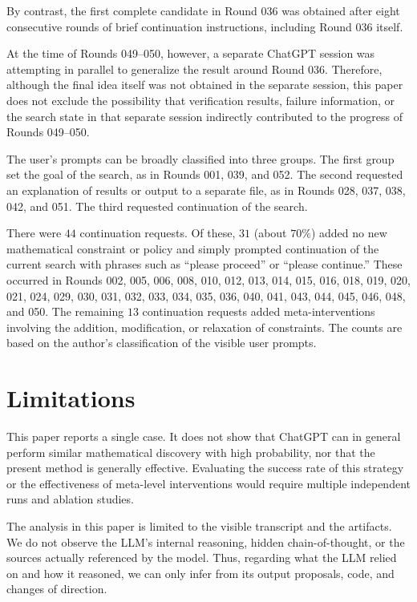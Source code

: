 \documentclass[11pt]{article}
\theoremstyle{definition}
\theoremstyle{remark}
\renewcommand{\_}{\textunderscore\allowbreak}
\begin{document}
By contrast, the first complete candidate in Round 036 was obtained
after eight consecutive rounds of brief continuation instructions,
including Round 036 itself.

At the time of Rounds 049--050, however, a separate ChatGPT session was
attempting in parallel to generalize the result around Round 036.
Therefore, although the final idea itself was not obtained in the
separate session, this paper does not exclude the possibility that
verification results, failure information, or the search state in that
separate session indirectly contributed to the progress of Rounds
049--050.

The user's prompts can be broadly classified into three groups. The
first group set the goal of the search, as in Rounds 001, 039, and 052.
The second requested an explanation of results or output to a separate
file, as in Rounds 028, 037, 038, 042, and 051. The third requested
continuation of the search.

There were \(44\) continuation requests. Of these, \(31\) (about
\(70\%\)) added no new mathematical constraint or policy and simply
prompted continuation of the current search with phrases such as
``please proceed'' or ``please continue.'' These occurred in Rounds 002,
005, 006, 008, 010, 012, 013, 014, 015, 016, 018, 019, 020, 021, 024,
029, 030, 031, 032, 033, 034, 035, 036, 040, 041, 043, 044, 045, 046,
048, and 050. The remaining \(13\) continuation requests added
meta-interventions involving the addition, modification, or relaxation
of constraints. The counts are based on the author's classification of
the visible user prompts.


\section{Limitations}\label{limitations}

This paper reports a single case. It does not show that ChatGPT can in
general perform similar mathematical discovery with high probability,
nor that the present method is generally effective. Evaluating the success
rate of this strategy or the effectiveness of meta-level interventions
would require multiple independent runs and ablation studies.

The analysis in this paper is limited to the visible transcript and the
artifacts. We do not observe the LLM's internal reasoning, hidden
chain-of-thought, or the sources actually referenced by the model. Thus,
regarding what the LLM relied on and how it reasoned, we can only infer
from its output proposals, code, and changes of direction.
\end{document}
